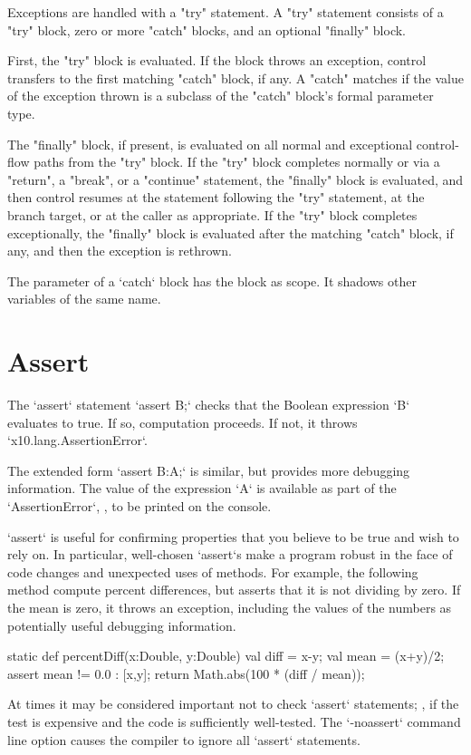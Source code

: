 Exceptions are handled with a \xcd"try" statement.
A \xcd"try" statement consists of a \xcd"try" block, zero or more
\xcd"catch" blocks, and an optional \xcd"finally" block.

First, the \xcd"try" block is evaluated.  If the block throws an
exception, control transfers to the first matching \xcd"catch"
block, if any.  A \xcd"catch" matches if the value of the
exception thrown is a subclass of the \xcd"catch" block's formal
parameter type.

The \xcd"finally" block, if present, is evaluated on all normal
and exceptional control-flow paths from the \xcd"try" block.
If the \xcd"try" block completes normally
or via a \xcd"return", a \xcd"break", or a
\xcd"continue" statement, 
the \xcd"finally"
block is evaluated, and then control resumes at
the statement following the \xcd"try" statement, at the branch target, or at
the caller as appropriate.
If the \xcd"try" block completes
exceptionally, the \xcd"finally" block is evaluated after the
matching \xcd"catch" block, if any, and then the
exception is rethrown.


The parameter of a \xcd`catch` block has the block as scope.  It shadows other
variables of the same name.

\section{Assert}

The \xcd`assert` statement 
\xcd`assert B;` 
checks that the Boolean expression \xcd`B` evaluates to true.  If so,
computation proceeds.  If not, it throws \xcd`x10.lang.AssertionError`.

The extended form 
\xcd`assert B:A;`
is similar, but provides more debugging information.  The value of the
expression \xcd`A` is available as part of the \xcd`AssertionError`, \eg, to
be printed on the console.

\begin{ex}
\xcd`assert` is useful for confirming properties that you believe to be true
and wish to rely on.  In particular, well-chosen \xcd`assert`s make a program
robust in the face of code changes and unexpected uses of methods.
For example, the following method compute percent differences, but asserts
that it is not dividing by zero.  If the mean is zero, it throws an exception,
including the values of the numbers as potentially useful debugging
information. 
\begin{xten}
static def percentDiff(x:Double, y:Double) {
  val diff = x-y;
  val mean = (x+y)/2;
  assert mean != 0.0  : [x,y]; 
  return Math.abs(100 * (diff / mean));
}
\end{xten}

\end{ex}


At times it may be considered important not to check \xcd`assert` statements;
\eg, if the test is expensive and the code is sufficiently well-tested.  The
\xcd`-noassert` command line option causes the compiler to ignore all
\xcd`assert` statements. 
